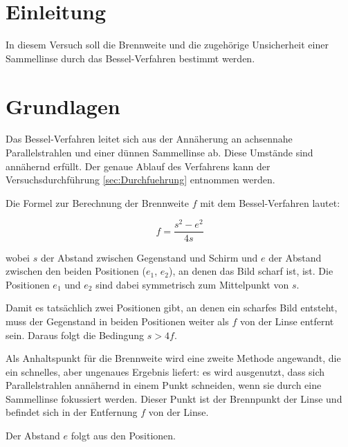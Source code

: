 \documentclass[a4paper,12pt]{article}
\begin{document}
\tableofcontents
\newpage


\section{Einleitung}

In diesem Versuch soll die Brennweite und die zugehörige Unsicherheit einer Sammellinse durch 
das Bessel-Verfahren bestimmt werden.

\section{Grundlagen}


Das Bessel-Verfahren leitet sich aus der Annäherung an achsennahe Parallelstrahlen und einer dünnen Sammellinse ab.
Diese Umstände sind annähernd erfüllt.
Der genaue Ablauf des Verfahrens kann der Versuchsdurchführung \ref{sec:Durchfuehrung} entnommen werden.

Die Formel zur Berechnung der Brennweite $f$ mit dem Bessel-Verfahren lautet:

\begin{equation}
    \label{eq:BesselBrennweite}
    f = \frac{s^2 - e^2}{4s}
\end{equation}

wobei $s$ der Abstand zwischen Gegenstand und Schirm und $e$ der Abstand zwischen den beiden
Positionen ($e_1$, $e_2$), an denen das Bild scharf ist, ist. Die Positionen $e_1$ und $e_2$
sind dabei symmetrisch zum Mittelpunkt von $s$.

Damit es tatsächlich zwei Positionen gibt, an denen ein scharfes Bild entsteht, muss der Gegenstand
in beiden Positionen weiter als $f$ von der Linse entfernt sein. Daraus folgt die Bedingung $s>4f$.

Als Anhaltspunkt für die Brennweite wird eine zweite Methode angewandt, die ein schnelles,
aber ungenaues Ergebnis liefert: es wird ausgenutzt, dass sich Parallelstrahlen annähernd in einem Punkt schneiden, wenn sie durch eine
Sammellinse fokussiert werden. Dieser Punkt ist der Brennpunkt der Linse und befindet sich in der Entfernung $f$
von der Linse.

Der Abstand $e$ folgt aus den Positionen.
\end{document}
